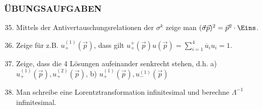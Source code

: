 \documentclass[twoside,a4paper]{scrartcl}
\renewcommand{\1}{\mathds{1}}
\renewcommand{\L}{\Lambda}
\begin{document}
\subsubsection*{ÜBUNGSAUFGABEN}
\begin{enumerate}
\setcounter{enumi}{34}
\item Mittels der Antivertauschungsrelationen der $\sigma^k$ zeige man $(\vec \sigma \vec p)^2=\vec p^2 \cdot \Eins$.
\item Zeige für z.B. $u_+^{(1)}(\vec p)$, dass gilt $u_+^{+}(\vec p)u(\vec p)=\sum_{i=1}^4 \overline{u}_i u_i=1$.
\item Zeige, dass die 4 Lösungen aufeinander senkrecht stehen, d.h. a) $u_+^{(1)}(\vec p), u_+^{(2)}(\vec p)$, b) $u_+^{(1)}(\vec p), u_-^{(1)}(\vec p)$
\item Man schreibe eine Lorentztransformation infinitesimal und berechne $\L^{-1}$ infinitesimal.
\end{enumerate}
\end{document}
